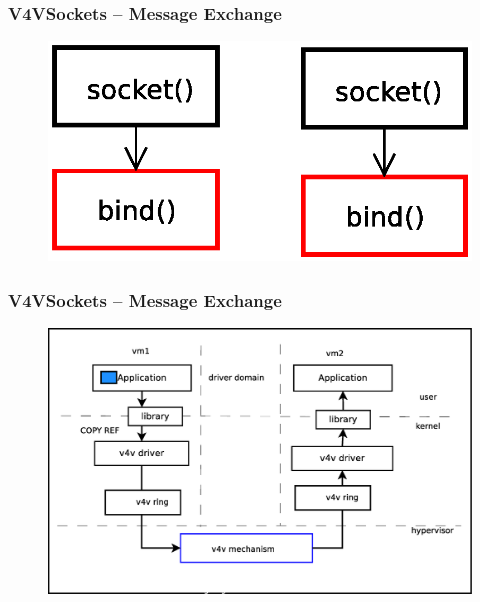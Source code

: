 \documentclass[red,slidestop,notes,compress,mathserif]{beamer}
\begin{document}
\begin{frame}
\frametitle{V4VSockets -- Message Exchange}
\begin{figure}
\includegraphics[scale=0.30]{figures/sockets5.eps}
\end{figure}
\end{frame}

\begin{frame}
\frametitle{V4VSockets -- Message Exchange}
\begin{figure}
\includegraphics[scale=0.30]{figures/v4vsockets5.eps}
\end{figure}
\end{frame}
\end{document}
